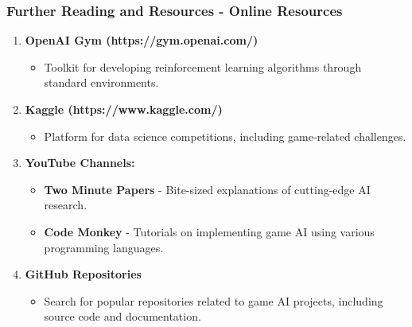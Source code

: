 \documentclass[aspectratio=169]{beamer}
\begin{document}
\begin{frame}[fragile]
    \frametitle{Further Reading and Resources - Online Resources}
    \begin{enumerate}
        \item \textbf{OpenAI Gym (https://gym.openai.com/)}
            \begin{itemize}
                \item Toolkit for developing reinforcement learning algorithms through standard environments.
            \end{itemize}
        \item \textbf{Kaggle (https://www.kaggle.com/)}
            \begin{itemize}
                \item Platform for data science competitions, including game-related challenges.
            \end{itemize}
        \item \textbf{YouTube Channels:}
            \begin{itemize}
                \item \textbf{Two Minute Papers} - Bite-sized explanations of cutting-edge AI research.
                \item \textbf{Code Monkey} - Tutorials on implementing game AI using various programming languages.
            \end{itemize}
        \item \textbf{GitHub Repositories}
            \begin{itemize}
                \item Search for popular repositories related to game AI projects, including source code and documentation.
            \end{itemize}
    \end{enumerate}
\end{frame}
\end{document}
